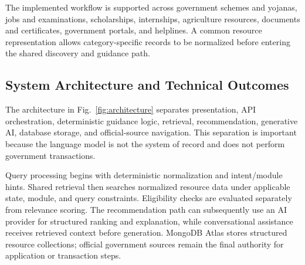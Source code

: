 \documentclass[conference]{IEEEtran}
\begin{document}
The implemented workflow is supported across government schemes and yojanas, jobs and examinations, scholarships, internships, agriculture resources, documents and certificates, government portals, and helplines. A common resource representation allows category-specific records to be normalized before entering the shared discovery and guidance path.

\subsection{System Architecture and Technical Outcomes}
The architecture in Fig.~\ref{fig:architecture} separates presentation, API orchestration, deterministic guidance logic, retrieval, recommendation, generative AI, database storage, and official-source navigation. This separation is important because the language model is not the system of record and does not perform government transactions.

Query processing begins with deterministic normalization and intent/module hints. Shared retrieval then searches normalized resource data under applicable state, module, and query constraints. Eligibility checks are evaluated separately from relevance scoring. The recommendation path can subsequently use an AI provider for structured ranking and explanation, while conversational assistance receives retrieved context before generation. MongoDB Atlas stores structured resource collections; official government sources remain the final authority for application or transaction steps.
\end{document}
